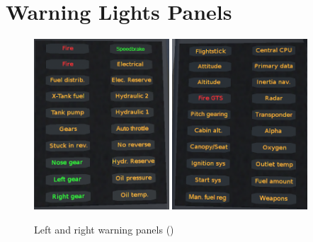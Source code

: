 \documentclass[a4paper]{report}
\begin{document}
\section{Warning Lights Panels}
\begin{figure}[ht!]
  \centering
  \includegraphics[width=0.45\textwidth]{images/panels/left-warning-panel.png}
  \includegraphics[width=0.45\textwidth]{images/panels/right-warning-panel.png}
  \caption{Left and right warning panels ()}
  \label{fig:warning-panels}
\end{figure}
\end{document}
